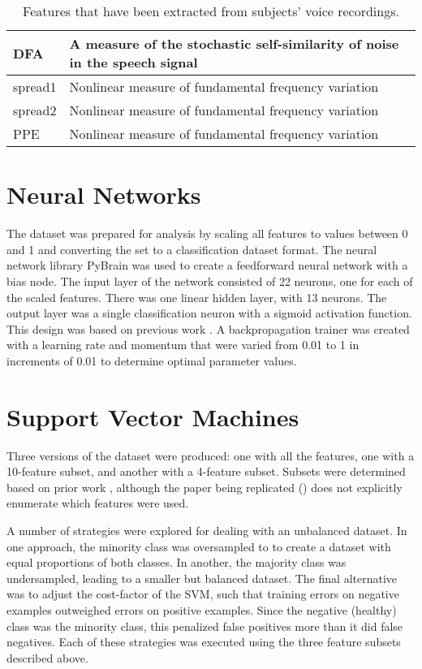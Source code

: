 \documentclass[draftcopy]{srpaper}
\begin{document}
\begin{table}
\begin{center}
\begin{tabular}{|l|p{10cm}|}
DFA & A measure of the stochastic self-similarity of noise in the
speech signal \\ \hline
spread1 & Nonlinear measure of fundamental frequency variation \\ \hline
spread2 & Nonlinear measure of fundamental frequency variation \\ \hline
PPE & Nonlinear measure of fundamental frequency variation \\ \hline
\end{tabular}
\end{center}
\caption[Features from Voice Recordings]{Features that have been extracted
  from subjects' voice recordings.}
\label{table:attributes}
\end{table}


\section{Neural Networks}
The dataset was prepared for analysis by scaling
all features to values between 0 and 1 and converting the set to a
classification dataset format. The neural network library PyBrain
\cite{pybrain} was used to create a feedforward neural network with a
bias node. The input layer of the network consisted of 22 neurons, one
for each of the scaled features. There was one linear hidden layer, with
13 neurons. The output layer was a single classification neuron with a
sigmoid activation function. This design was based on previous work
\cite{GJ70}. A backpropagation trainer was created with a learning
rate and momentum that were varied
from 0.01 to 1 in increments of 0.01 to determine optimal parameter values. 


\section{Support Vector Machines}
Three versions of the dataset were produced: one with all the
features, one with a 10-feature subset, and another with a 4-feature
subset. Subsets were determined based on prior work
\cite{LittleMHSR09}, although the paper being replicated (\cite{MS12})
does not explicitly enumerate which features were used.

A number of strategies were explored for dealing with an unbalanced
dataset. In one approach, the minority class was oversampled to to create a dataset
with equal proportions of both classes. In another, the majority class
was undersampled, leading to a smaller but balanced dataset. The final
alternative was to adjust the cost-factor of the SVM, such that
training errors on negative examples outweighed errors on positive
examples. Since the negative (healthy) class was the minority class,
this penalized false positives more than it did false negatives. Each
of these strategies was executed using the three feature subsets
described above.
\end{document}
